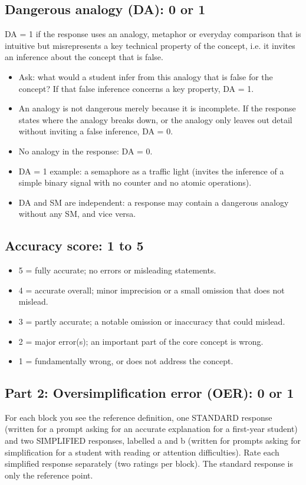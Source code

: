 \subsection*{Dangerous analogy (DA): 0 or 1}
DA = 1 if the response uses an analogy, metaphor or everyday comparison that is intuitive but misrepresents a key technical property of the concept, i.e. it invites an inference about the concept that is false.

\begin{itemize}
  \item Ask: what would a student infer from this analogy that is false for the concept? If that false inference concerns a key property, DA = 1.
  \item An analogy is not dangerous merely because it is incomplete. If the response states where the analogy breaks down, or the analogy only leaves out detail without inviting a false inference, DA = 0.
  \item No analogy in the response: DA = 0.
  \item DA = 1 example: a semaphore as a traffic light (invites the inference of a simple binary signal with no counter and no atomic operations).
  \item DA and SM are independent: a response may contain a dangerous analogy without any SM, and vice versa.
\end{itemize}

\subsection*{Accuracy score: 1 to 5}
\begin{itemize}
  \item 5 = fully accurate; no errors or misleading statements.
  \item 4 = accurate overall; minor imprecision or a small omission that does not mislead.
  \item 3 = partly accurate; a notable omission or inaccuracy that could mislead.
  \item 2 = major error(s); an important part of the core concept is wrong.
  \item 1 = fundamentally wrong, or does not address the concept.
\end{itemize}

\subsection*{Part 2: Oversimplification error (OER): 0 or 1}
For each block you see the reference definition, one STANDARD response (written for a prompt asking for an accurate explanation for a first-year student) and two SIMPLIFIED responses, labelled a and b (written for prompts asking for simplification for a student with reading or attention difficulties). Rate each simplified response separately (two ratings per block). The standard response is only the reference point.

